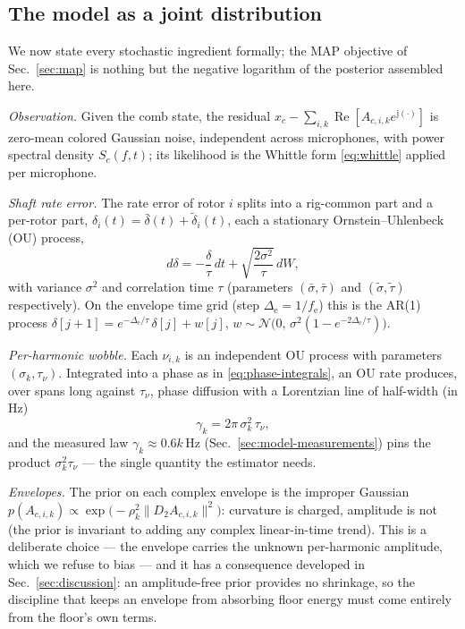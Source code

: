 \documentclass[journal]{IEEEtran}
\newcommand{\fsenv}{\ensuremath{f_{\mathrm{e}}}}
\begin{document}
\subsection{The model as a joint distribution}
\label{sec:model-distributions}

We now state every stochastic ingredient formally; the MAP objective of
Sec.~\ref{sec:map} is nothing but the negative logarithm of the
posterior assembled here.

\emph{Observation.} Given the comb state, the residual
$x_c - \sum_{i,k}\operatorname{Re}[A_{c,i,k} e^{\mathrm{j}(\cdot)}]$ is
zero-mean colored Gaussian noise, independent across microphones, with
power spectral density $S_c(f,t)$; its likelihood is the Whittle form
\eqref{eq:whittle} applied per microphone.

\emph{Shaft rate error.} The rate error of rotor $i$ splits into a
rig-common part and a per-rotor part,
$\delta_i(t) = \bar\delta(t) + \tilde\delta_i(t)$, each a stationary
Ornstein--Uhlenbeck (OU) process,
\begin{equation}
  d\delta = -\frac{\delta}{\tau}\,dt
  + \sqrt{\frac{2\sigma^2}{\tau}}\, dW,
  \label{eq:ou}
\end{equation}
with variance $\sigma^2$ and correlation time $\tau$ (parameters
$(\bar\sigma,\bar\tau)$ and $(\tilde\sigma,\tilde\tau)$ respectively).
On the envelope time grid (step $\Delta_{\mathrm{e}} = 1/\fsenv$) this
is the AR(1) process
$\delta[j{+}1] = e^{-\Delta_{\mathrm{e}}/\tau}\,\delta[j] + w[j]$,
$w \sim \mathcal{N}\!\big(0,\, \sigma^2 (1 -
e^{-2\Delta_{\mathrm{e}}/\tau})\big)$.

\emph{Per-harmonic wobble.} Each $\nu_{i,k}$ is an independent OU
process with parameters $(\sigma_k, \tau_\nu)$. Integrated into a phase
as in \eqref{eq:phase-integrals}, an OU rate produces, over spans long
against $\tau_\nu$, phase diffusion with a Lorentzian line of
half-width (in Hz)
\begin{equation}
  \gamma_k = 2\pi\, \sigma_k^2\, \tau_\nu ,
  \label{eq:linewidth}
\end{equation}
and the measured law $\gamma_k \approx 0.6k$\,Hz
(Sec.~\ref{sec:model-measurements}) pins the product
$\sigma_k^2 \tau_\nu$ --- the single quantity the estimator needs.

\emph{Envelopes.} The prior on each complex envelope is the improper
Gaussian
$p(A_{c,i,k}) \propto \exp\!\big( -\rho_k^2 \lVert D_2 A_{c,i,k}
\rVert^2 \big)$: curvature is charged, amplitude is not (the prior is
invariant to adding any complex linear-in-time trend). This is a
deliberate choice --- the envelope carries the unknown per-harmonic
amplitude, which we refuse to bias --- and it has a consequence
developed in Sec.~\ref{sec:discussion}: an amplitude-free prior
provides no shrinkage, so the discipline that keeps an envelope from
absorbing floor energy must come entirely from the floor's own terms.
\end{document}
